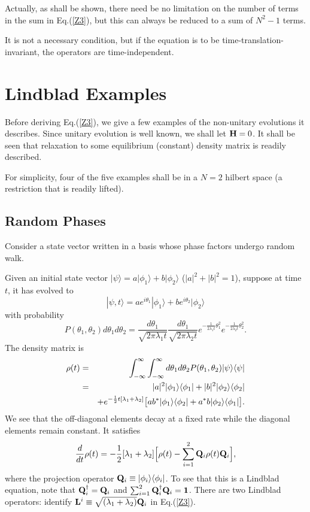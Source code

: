 \documentclass[aps,pra,twocolumn,amssymb, amsfonts,amsmath,showpacs, superscriptaddress]{revtex4}
\begin{document}
Actually, as shall be shown, there need be no limitation on the number of terms in the sum in Eq.(\ref{Z3}),  but this can always be reduced to a sum of 
$N^{2}-1$ terms.  

 It is not a necessary condition, but if the equation is to be time-translation-invariant, the operators are time-independent. 

\section{Lindblad Examples}

Before deriving Eq.(\ref{Z3}), we give a few examples of the non-unitary evolutions  it describes.   Since unitary evolution is well known, we shall let ${\bf H}=0$.  It shall be seen that relaxation to some equilibrium (constant) density matrix is readily described. 

For simplicity, four of the five examples shall be in a $N=2$ hilbert space (a restriction that is readily lifted).  

\subsection{Random Phases}
Consider a state vector written in a basis whose phase factors undergo random walk. 

Given an initial state vector $|\psi\rangle=a|\phi_{1}\rangle+b|\phi_{2}\rangle$ ($|a|^{2}+|b|^{2}=1$), suppose at time $t$, it has evolved to  
\[
|\psi,t\rangle=ae^{i\theta_{1}}|\phi_{1}\rangle+be^{i\theta_{2}}|\phi_{2}\rangle
\]
\noindent    with probability 
\[
P(\theta_{1}, \theta_{2})d\theta_{1}d \theta_{2}=\frac{d\theta_{1}}{\sqrt{2\pi\lambda_{1}t}}\frac{d\theta_{1}}{\sqrt{2\pi\lambda_{2}t}}e^{-\frac{1}{2\lambda_{1}t}\theta_{1}^{2}}e^{-\frac{1}{2\lambda_{2}t}\theta_{2}^{2}}. 
\] 
The density matrix is
\begin{eqnarray}
{\bf \rho}(t)&=&\int_{-\infty}^{\infty} \int_{-\infty}^{\infty}d\theta_{1}d\theta_{2}P(\theta_{1}, \theta_{2})
|\psi\rangle\langle\psi|\nonumber\\
&=&|a|^{2}|\phi_{1}\rangle\langle\phi_{1}|+|b|^{2}|\phi_{2}\rangle\langle\phi_{2}|\nonumber\\
&&+e^{-\frac{1}{2}t[\lambda_{1}+\lambda_{2}]}\big[ab^{*}|\phi_{1}\rangle\langle\phi_{2}|+a^{*}b|\phi_{2}\rangle\langle\phi_{1}|\big]. \nonumber
\end{eqnarray}
\noindent  We see that the off-diagonal elements decay at a fixed rate while the diagonal elements remain constant.  It satisfies 
\[
\frac{d}{dt}{\bf \rho}(t)=-\frac{1}{2}[\lambda_{1}+\lambda_{2}]\Big[{\bf \rho}(t)-\sum_{i=1}^{2}{\bf Q}_{i}{\bf \rho}(t){\bf Q}_{i}\Big],
\]
\noindent where the projection operator ${\bf Q}_{i}\equiv|\phi_{i}\rangle\langle\phi_{i}|$.  To see that this is a Lindblad equation, note that  
${\bf Q}_{i}^{\dagger}={\bf Q}_{i}$ and $\sum_{i=1}^{2} {\bf Q}_{i}^{\dagger}{\bf Q}_{i}={\bf 1}$. There are two Lindblad operators:  identify ${\bf L}^{i}\equiv\sqrt{(\lambda_{1}+\lambda_{2})}{\bf Q}_{i}$ 
in Eq.(\ref{Z3}).
\end{document}
